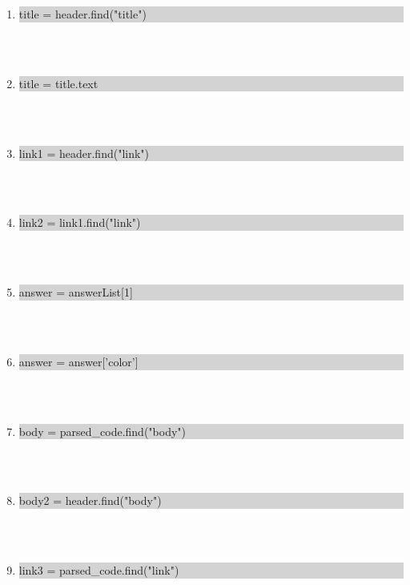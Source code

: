 \documentclass[11pt, letterpaper, onecolumn, oneside, final]{article}
\begin{document}
\begin{enumerate}
\begin{enumerate}
        \item \colorbox{lightgray}{\parbox{.36\textwidth}{\consolas title = header.find("title")}}\\\\
        
        \item \colorbox{lightgray}{\parbox{.23\textwidth}{\consolas title = title.text}} \\\\ %
        
        \item \colorbox{lightgray}{\parbox{.34\textwidth}{\consolas link1 =  header.find("link")}} \\\\
        
        \item \colorbox{lightgray}{\parbox{.33\textwidth}{\consolas link2 =  link1.find("link")}} \\\\ %
        
        
        \item \colorbox{lightgray}{\parbox{.28\textwidth}{\consolas answer = answerList[1]}}\\\\ %
        
        \item \colorbox{lightgray}{\parbox{.3\textwidth}{\consolas answer = answer['color']}}\\\\
        
        \item \colorbox{lightgray}{\parbox{.39\textwidth}{\consolas body = parsed\_code.find("body")}}\\\\ %
        
        \item \colorbox{lightgray}{\parbox{.34\textwidth}{\consolas body2 = header.find("body")}}\\\\ %
        
        \item \colorbox{lightgray}{\parbox{.41\textwidth}{\consolas link3 = parsed\_code.find("link")}}\\\\ %
        

\end{enumerate}
\end{enumerate}
\end{document}
